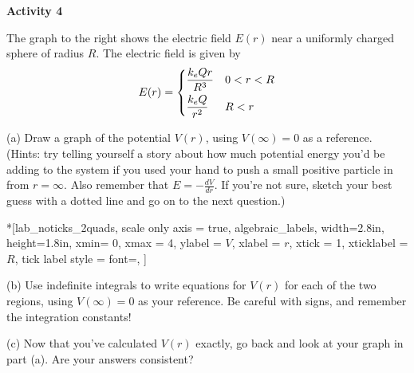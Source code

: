 \textbf{Activity 4} 

The graph to the right shows the electric field $E(r)$ near a uniformly charged sphere of radius $R$.  The electric field is given by
\begin{displaymath}
E(r) = \begin{dcases}
        \frac{k_eQr}{R^3}  &  0<r<R\\
        \frac{k_eQ}{r^2}  &  R<r
        \end{dcases}
\end{displaymath}





(a) Draw a graph of the potential $V(r)$, using $V(\infty)=0$ as a reference.  (Hints: try telling yourself a story about how much potential energy you'd be adding to the system if you used your hand to push a small positive particle in from $r=\infty$.  Also remember that $E = - \frac{dV}{dr}$.  If you're not sure, sketch your best guess with a dotted line and go on to the next question.)

\begin{lab_axis}*[lab_noticks_2quads,
	scale only axis = true,
	algebraic_labels,
	width={2.8in}, height={1.8in},
	xmin= 0, xmax = 4,
	ylabel = {$V$},
	xlabel = {$r$},
	xtick = {1},
	xticklabel = {$R$},
	tick label style = {font=\itshape},
]
\end{lab_axis}

(b) Use indefinite integrals to write equations for $V(r)$ for each of the two regions, using $V(\infty)=0$ as your reference.  Be careful with signs, and remember the integration constants!
\answerspace{1.3in}

\vfill
(c) Now that you've calculated $V(r)$ exactly, go back and look at your graph in part (a).  Are your answers consistent?
